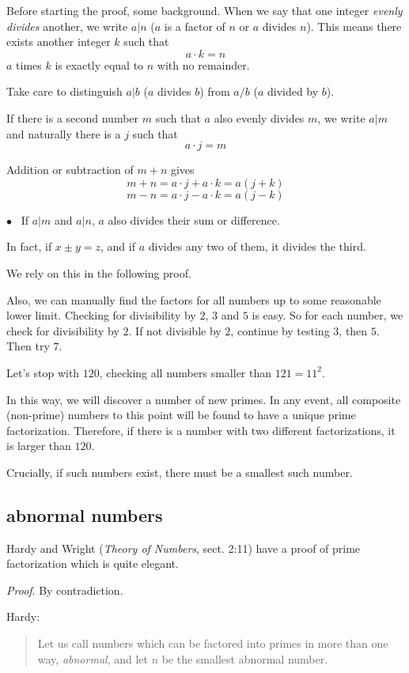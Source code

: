 \documentclass[11pt, oneside]{article}
\begin{document}
Before starting the proof, some background.  When we say that one integer \emph{evenly divides} another, we write $a|n$ ($a$ is a factor of $n$ or $a$ divides $n$).  This means there exists another integer $k$ such that
\[ a \cdot k = n \]
$a$ times $k$ is exactly equal to $n$ with no remainder.

Take care to distinguish $a|b$ ($a$ divides $b$) from $a/b$ ($a$ divided by $b$).

If there is a second number $m$ such that $a$ also evenly divides $m$, we write $a|m$ and naturally there is a $j$ such that
\[ a \cdot j = m \]

Addition or subtraction of $m + n$ gives
\[ m + n = a \cdot j + a \cdot k = a(j + k) \]
\[ m - n = a \cdot j - a \cdot k = a(j - k) \]

$\bullet$ \ If $a|m$ and $a|n$, $a$ also divides their sum or difference.

In fact, if $x \pm y = z$, and if $a$ divides any two of them, it divides the third.

We rely on this in the following proof.

Also, we can manually find the factors for all numbers up to some reasonable lower limit.  Checking for divisibility by $2$, $3$ and $5$ is easy. So for each number, we check for divisibility by $2$.  If not divisible by $2$, continue by testing $3$, then $5$.  Then try $7$.

Let's stop with $120$, checking all numbers smaller than $121 = 11^2$.

In this way, we will discover a number of new primes.  In any event, all composite (non-prime) numbers to this point will be found to have a unique prime factorization.  Therefore, if there is a number with two different factorizations, it is larger than $120$.

Crucially, if such numbers exist, there must be a smallest such number.

\subsection*{abnormal numbers}

Hardy and Wright (\emph{Theory of Numbers}, sect. 2:11) have a proof of prime factorization which is quite elegant.

\emph{Proof}.  By contradiction.

Hardy:
\begin{quote}Let us call numbers which can be factored into primes in more than one way, \emph{abnormal}, and let $n$ be the smallest abnormal number.\end{quote}
\end{document}
